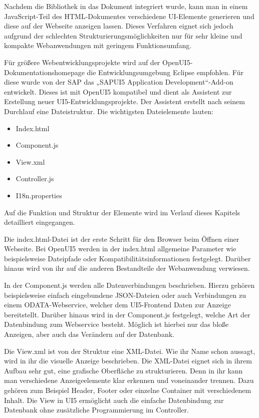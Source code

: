 Nachdem die Bibliothek in das Dokument integriert wurde, kann man in einem JavaScript-Teil des HTML-Dokumentes verschiedene UI-Elemente generieren und diese auf der Webseite anzeigen lassen. Dieses Verfahren eignet sich jedoch aufgrund der schlechten Strukturierungsmöglichkeiten nur für sehr kleine und kompakte Webanwendungen mit geringem Funktionsumfang. 

Für größere Webentwicklungsprojekte wird auf der OpenUI5-Dokumentationshomepage die Entwicklungsumgebung Eclipse empfohlen. Für diese wurde von der SAP das „SAPUI5 Application Development“-Add-on entwickelt. Dieses ist mit OpenUI5 kompatibel und dient als Assistent zur Erstellung neuer UI5-Entwicklungsprojekte. Der Assistent erstellt nach seinem Durchlauf eine Dateistruktur. Die wichtigsten Dateielemente lauten:

\begin{itemize}
	\item Index.html
	\item Component.js
	\item View.xml
	\item Controller.js
	\item I18n.properties
\end{itemize}

Auf die Funktion und Struktur der Elemente wird im Verlauf dieses Kapitels detailliert eingegangen.

Die index.html-Datei ist der erste Schritt für den Browser beim Öffnen einer Webseite. Bei OpenUI5 werden in der index.html allgemeine Parameter wie beispielsweise Dateipfade oder Kompatibilitätsinformationen festgelegt. Darüber hinaus wird von ihr auf die anderen Bestandteile der Webanwendung verwiesen.

In der Component.js werden alle Datenverbindungen beschrieben. Hierzu gehören beispielsweise einfach eingebundene JSON-Dateien oder auch Verbindungen zu einem ODATA-Webservice, welcher dem UI5-Frontend Daten zur Anzeige bereitstellt. Darüber hinaus wird in der Component.js festgelegt, welche Art der Datenbindung zum Webservice besteht. Möglich ist hierbei nur das bloße Anzeigen, aber auch das Verändern auf der Datenbank.

Die View.xml ist von der Struktur eine XML-Datei. Wie ihr Name schon aussagt, wird in ihr die visuelle Anzeige beschrieben. Die XML-Datei eignet sich in ihrem Aufbau sehr gut, eine grafische Oberfläche zu strukturieren. Denn in ihr kann man verschiedene Anzeigeelemente klar erkennen und voneinander trennen. Dazu gehören zum Beispiel Header, Footer oder einzelne Container mit verschiedenem Inhalt. Die View in UI5 ermöglicht auch die einfache Datenbindung zur Datenbank ohne zusätzliche Programmierung im Controller.

